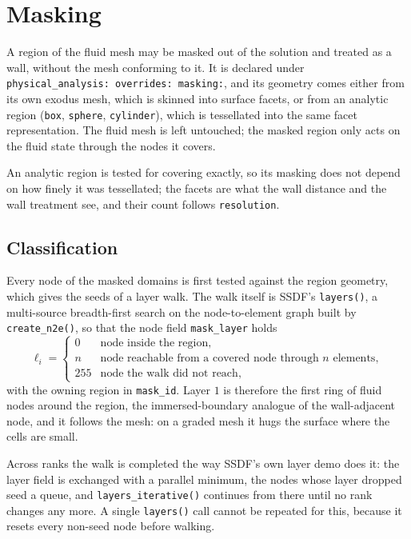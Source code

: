 \documentclass[12pt]{extarticle}
\newcommand{\<}{\langle}
\renewcommand{\>}{\rangle}
\theoremstyle{definition}
\begin{document}
\section{Masking}

A region of the fluid mesh may be masked out of the solution and treated as a
wall, without the mesh conforming to it. It is
declared under \texttt{physical\_analysis: overrides: masking:}, and its geometry
comes either from its own exodus mesh, which is skinned into surface facets, or
from an analytic region (\texttt{box}, \texttt{sphere}, \texttt{cylinder}), which
is tessellated into the same facet representation. The fluid mesh is left
untouched; the masked region only acts on the fluid state through the nodes it covers.

An analytic region is tested for covering exactly, so its masking does not depend
on how finely it was tessellated; the facets are what the wall distance and the
wall treatment see, and their count follows \texttt{resolution}.

\subsection{Classification}

Every node of the masked domains is first tested against the region geometry,
which gives the seeds of a layer walk. The walk itself is SSDF's
\texttt{layers()}, a multi-source breadth-first search on the node-to-element
graph built by \texttt{create\_n2e()}, so that the node field
\texttt{mask\_layer} holds
\begin{equation}
    \ell_i =
    \begin{cases}
        0 & \text{node inside the region},\\
        n & \text{node reachable from a covered node through } n \text{ elements},\\
        255 & \text{node the walk did not reach},
    \end{cases}
\end{equation}
with the owning region in \texttt{mask\_id}. Layer $1$ is therefore the first
ring of fluid nodes around the region, the immersed-boundary analogue of the
wall-adjacent node, and it follows the mesh: on a graded mesh it hugs the
surface where the cells are small.

Across ranks the walk is completed the way SSDF's own layer demo does it: the
layer field is exchanged with a parallel minimum, the nodes whose layer dropped
seed a queue, and \texttt{layers\_iterative()} continues from there until no
rank changes any more. A single \texttt{layers()} call cannot be repeated for
this, because it resets every non-seed node before walking.
\end{document}
